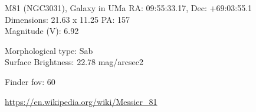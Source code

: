 \begin{block}{M81 (NGC3031), Galaxy in UMa}
    RA: 09:55:33.17, Dec: +69:03:55.1 \\ 
    Dimensions: 21.63 x 11.25 PA: 157 \\ 
    Magnitude (V): 6.92

    Morphological type: Sab \\ 
    Surface Brightness: 22.78 mag/arcsec2 


    Finder fov: 60 

    \url{https://en.wikipedia.org/wiki/Messier_81} 
\end{block}